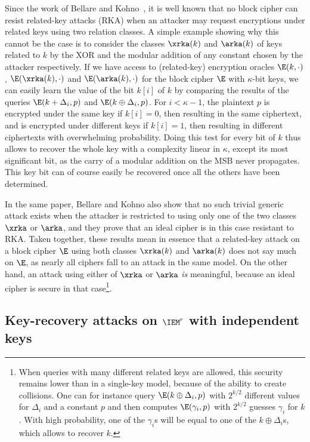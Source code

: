 Since the work of Bellare and Kohno~\cite{BK03}, it is well known that no block cipher can resist
related-key attacks (RKA) when an attacker may request encryptions under related keys
using two relation classes. A simple example showing why this cannot be the case
is to consider the classes $\xrka(k)$ and $\arka(k)$ of keys
related to $k$ by the XOR and the modular addition of any constant chosen by the attacker respectively.
If we have access to (related-key) encryption oracles
$\E(k,\cdot)$, $\E(\xrka(k),\cdot)$ and $\E(\arka(k),\cdot)$ for the block cipher $\E$ with $\kappa$-bit keys,
we can easily learn the value of the bit $k[i]$ of $k$ by comparing the results of the queries
$\E(k + \Delta_i, p)$
and $\E(k \oplus \Delta_i, p)$. For $i < \kappa - 1$, the plaintext
$p$ is encrypted under the same key if
$k[i] = 0$, then resulting in the same ciphertext, and is
encrypted under different keys if $k[i] = 1$, then resulting in different ciphertexts
with overwhelming probability.
Doing this test for every bit of $k$ thus allows to recover the whole key
with a complexity linear in $\kappa$, except its most significant bit, as
the carry of a modular addition on the MSB never propagates.%
This key bit can of course easily be recovered once all the others have been determined.

In the same paper, Bellare and Kohno also show that no such trivial generic attack exists when
the attacker is restricted to using
only one of the two classes $\xrka$ or $\arka$, and they prove that an ideal
cipher is in this case resistant to RKA. Taken together, these results mean in essence
that a related-key attack on a block cipher $\E$ using both classes $\xrka(k)$ and $\arka(k)$ does not say
much on $\E$, as nearly all ciphers fall to an attack
in the same model. On the other hand, an attack using either of $\xrka$ or $\arka$ \emph{is} meaningful,
because an ideal cipher is secure in that case\footnote{When
queries with many different related keys are allowed, this security remains lower than in a single-key model,
because of the ability to create collisions. One can
for instance query $\E(k\oplus\Delta_i,p)$ with $2^{k/2}$ different values for $\Delta_i$ and a constant $p$
and then computes $\E(\gamma_i,p)$ with $2^{k/2}$ guesses $\gamma_i$ for $k$. With high probability, one
of the $\gamma_i$s will be equal to one of the $k\oplus\Delta_i$s, which allows to recover $k$.}.

\subsection{Key-recovery attacks on $\IEM^r$ with independent keys}

